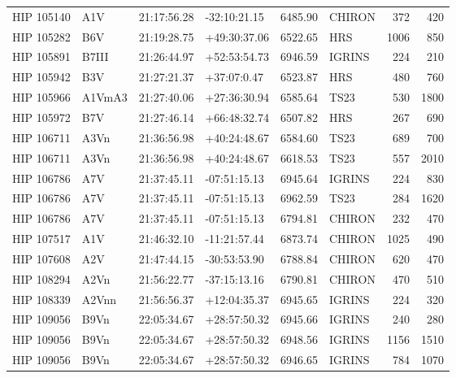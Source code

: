 \documentclass{emulateapj}
\begin{document}
\begin{longtable*}{|l|lllrlrr|}
  HIP 105140 &            A1V &    21:17:56.28 &   -32:10:21.15 &  6485.90 &     CHIRON &      372 &     420 \\
  HIP 105282 &            B6V &    21:19:28.75 &   +49:30:37.06 &  6522.65 &        HRS &     1006 &     850 \\
  HIP 105891 &          B7III &    21:26:44.97 &   +52:53:54.73 &  6946.59 &     IGRINS &      224 &     210 \\
  HIP 105942 &            B3V &    21:27:21.37 &    +37:07:0.47 &  6523.87 &        HRS &      480 &     760 \\
  HIP 105966 &         A1VmA3 &    21:27:40.06 &   +27:36:30.94 &  6585.64 &       TS23 &      530 &    1800 \\
  HIP 105972 &            B7V &    21:27:46.14 &   +66:48:32.74 &  6507.82 &        HRS &      267 &     690 \\
  HIP 106711 &           A3Vn &    21:36:56.98 &   +40:24:48.67 &  6584.60 &       TS23 &      689 &     700 \\
  HIP 106711 &           A3Vn &    21:36:56.98 &   +40:24:48.67 &  6618.53 &       TS23 &      557 &    2010 \\
  HIP 106786 &            A7V &    21:37:45.11 &   -07:51:15.13 &  6945.64 &     IGRINS &      224 &     830 \\
  HIP 106786 &            A7V &    21:37:45.11 &   -07:51:15.13 &  6962.59 &       TS23 &      284 &    1620 \\
  HIP 106786 &            A7V &    21:37:45.11 &   -07:51:15.13 &  6794.81 &     CHIRON &      232 &     470 \\
  HIP 107517 &            A1V &    21:46:32.10 &   -11:21:57.44 &  6873.74 &     CHIRON &     1025 &     490 \\
  HIP 107608 &            A2V &    21:47:44.15 &   -30:53:53.90 &  6788.84 &     CHIRON &      620 &     470 \\
  HIP 108294 &           A2Vn &    21:56:22.77 &   -37:15:13.16 &  6790.81 &     CHIRON &      470 &     510 \\
  HIP 108339 &          A2Vnn &    21:56:56.37 &   +12:04:35.37 &  6945.65 &     IGRINS &      224 &     320 \\
  HIP 109056 &           B9Vn &    22:05:34.67 &   +28:57:50.32 &  6945.66 &     IGRINS &      240 &     280 \\
  HIP 109056 &           B9Vn &    22:05:34.67 &   +28:57:50.32 &  6948.56 &     IGRINS &     1156 &    1510 \\
  HIP 109056 &           B9Vn &    22:05:34.67 &   +28:57:50.32 &  6946.65 &     IGRINS &      784 &    1070 \\

\end{longtable*}
\end{document}
